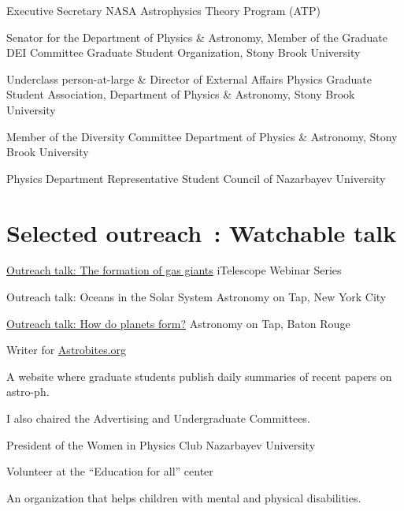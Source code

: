 \documentclass[10pt]{article} %
\begin{document}
\begin{paracol}{1}
	{Executive Secretary}
	{NASA Astrophysics Theory Program (ATP)}

	{Senator for the Department of Physics \& Astronomy, Member of the Graduate DEI Committee}
	{Graduate Student Organization, Stony Brook University}
	
	{Underclass person-at-large \& Director of External Affairs}
	{Physics Graduate Student Association, Department of Physics \& Astronomy, Stony Brook University}
	
	{Member of the Diversity Committee}
	{Department of Physics \& Astronomy, Stony Brook University}
	
	{Physics Department Representative}
	{Student Council of Nazarbayev University}
	
\section{Selected outreach \footnotesize {\faVideoCamera}\,: Watchable talk \phantom{XX.}}

	{\href{https://www.youtube.com/watch?v=w7dNKDIJ9DM}{Outreach talk: The formation of gas giants} \faVideoCamera}
	{iTelescope Webinar Series}

	{Outreach talk: Oceans in the Solar System}
	{Astronomy on Tap, New York City}
	
	{\href{https://www.youtube.com/watch?v=E-OefNM564E}{Outreach talk: How do planets form?} \faVideoCamera}
	{Astronomy on Tap, Baton Rouge}

	{Writer for \href{https://astrobites.org/author/ssagynbayeva/}{Astrobites.org}}
	{A website where graduate students publish daily summaries of recent papers on astro-ph.
	
	I also chaired the Advertising and Undergraduate Committees.}

	
	
	{President of the Women in Physics Club}
	{Nazarbayev University}
	

	{Volunteer at the “Education for all” center}
	{An organization that helps children with mental and physical disabilities. 
	
}
\end{paracol}
\end{document}
